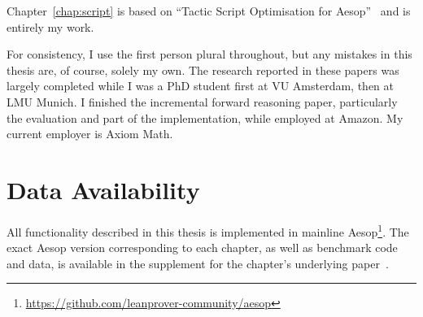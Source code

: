 Chapter~\ref{chap:script} is based on \enquote{Tactic Script Optimisation for Aesop}~\cite{Aesop-script} and is entirely my work.

For consistency, I use the first person plural throughout, but any mistakes in this thesis are, of course, solely my own.
The research reported in these papers was largely completed while I was a PhD student first at VU Amsterdam, then at LMU Munich.
I finished the incremental forward reasoning paper, particularly the evaluation and part of the implementation, while employed at Amazon.
My current employer is Axiom Math.

\section{Data Availability}

All functionality described in this thesis is implemented in mainline Aesop\footnote{\url{https://github.com/leanprover-community/aesop}}.
The exact Aesop version corresponding to each chapter, as well as benchmark code and data, is available in the supplement for the chapter's underlying paper~\cite{AesopSupplement,ForwardSupplement,ScriptSupplement}.
